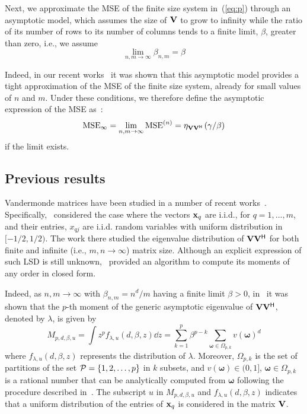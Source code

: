 \documentclass[11pt, draftcls, onecolumn, a4paper]{IEEEtran}
\newcommand{\xv}{{\bf x}}
\newcommand{\Vm}{{\bf V}}
\def\MSEinf{{\rm MSE}_{\infty}}
\newcommand{\Pc}{{\cal P}}
\newcommand{\omegav}{\boldsymbol{\omega}}
\def\Herm{\mathsf{^H}}
\begin{document}
Next, we approximate the MSE of the finite size system in~(\ref{eq:p})
through an asymptotic model, which assumes the size of $\Vm$ to grow
to infinity while the ratio of its number of rows to its number of
columns tends to a finite limit, $\beta$, greater than zero, i.e., we
assume
\[ \lim_{n,m\rightarrow \infty} \beta_{n,m} = \beta\] 

Indeed, in our recent works~\cite{TSP1,TSP2,TSP3} it was shown that this
asymptotic model provides a tight approximation of the MSE of the
finite size system, already for small values of $n$ and $m$.
Under these conditions, we therefore define the asymptotic expression
of the MSE as~\cite{TSP3}:
\begin{equation}
\MSEinf = \lim_{n,m\rightarrow \infty} {\rm MSE}^{(n)} =
\eta_{\Vm\Vm\Herm}\left(\gamma/\beta\right)
\label{eq:mseinf}
\end{equation}
if the limit exists.

   
\subsection{Previous results}

Vandermonde matrices have been studied in a number of recent
works~\cite{TSP1,TSP2,TSP3,RyanDebbah}. Specifically,~\cite{TSP2}
considered the case where the vectors $\xv_q$ are i.i.d., for
$q=1,\ldots,m$, and their entries, $x_{qj}$ are i.i.d. random
variables with uniform distribution in $[-1/2,1/2)$. The work there
studied the eigenvalue distribution 
  of $\Vm\Vm\Herm$ for both finite and infinite (i.e., $m,n\rightarrow
  \infty$) matrix size.  Although an explicit expression of such LSD
  is still unknown,~\cite{TSP2} provided an algorithm to compute its
  moments of any order in closed form.

Indeed, as $n,m\rightarrow \infty$ with $\beta_{n,m}=n^d/m$ having a
finite limit $\beta>0$, in~\cite{TSP2} it was
shown that the $p$-th moment of the generic asymptotic eigenvalue of 
$\Vm\Vm\Herm$, denoted by $\lambda$, is given by
\[ M_{p,d,\beta,u} = \int z^p f_{\lambda,u}(d,\beta,z) \dd z = 
\sum_{k=1}^p \beta^{p-k} \sum_{\omegav \in
  \Omega_{p,k}}v(\omegav)^d \] where $f_{\lambda,u}(d,\beta,z)$ 
represents the distribution of  $\lambda$.  Moreover, $\Omega_{p,k}$
is the set of partitions of the set $\Pc=\{1,2,\ldots,p\}$ in $k$
subsets, and $v(\omegav) \in (0,1]$, $\omegav \in \Omega_{p,k}$ is a
rational number that can be analytically computed from $\omegav$
following the procedure described in~\cite{TSP2}. The
subscript $u$ in $M_{p,d,\beta,u}$ and $f_{\lambda,u}(d,\beta,z)$
indicates that a uniform distribution of the entries of $\xv_q$ is
considered in the matrix $\Vm$.
\end{document}

